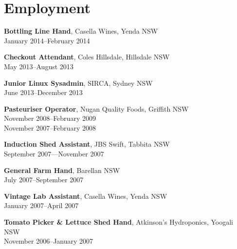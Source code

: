 \documentclass[10pt,a4paper]{article}
\renewenvironment{itemize}{
\begin{list}{}{
\setlength{\leftmargin}{1.5em}
\setlength{\itemsep}{0.25em}
\setlength{\parskip}{0pt}
\setlength{\parsep}{0.25em}
}
}{
\end{list}
}
\begin{document}
\vspace{-0.6cm}
\section*{Employment}
\begin{itemize}

\item \textbf{Bottling Line Hand}, Casella Wines, Yenda NSW \\
January 2014--February 2014

\item \textbf{Checkout Attendant}, Coles Hillsdale, Hillsdale NSW \\
May 2013--August 2013

\item \textbf{Junior Linux Sysadmin}, SIRCA, Sydney NSW \\
June 2013--December 2013

\item \textbf{Pasteuriser Operator}, Nugan Quality Foods, Griffith NSW\\
November 2008--February 2009 \\
November 2007--February 2008 

\item \textbf{Induction Shed Assistant}, JBS Swift, Tabbita NSW\\
September 2007---November 2007

\item \textbf{General Farm Hand}, Barellan NSW\\
July 2007--September 2007

\item \textbf{Vintage Lab Assistant}, Casella Wines, Yenda NSW\\
January 2007--April 2007

\item \textbf{Tomato Picker \& Lettuce Shed Hand}, Atkinson's Hydroponics, 
Yoogali NSW\\
November 2006--January 2007

\end{itemize}

\vspace{-0.6cm}
\end{document}
